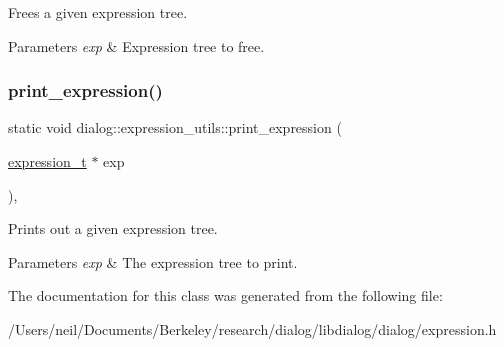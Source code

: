 Frees a given expression tree.


\begin{DoxyParams}{Parameters}
{\em exp} & Expression tree to free. \\
\hline
\end{DoxyParams}
\mbox{\label{classdialog_1_1expression__utils_ab26b15dece4bf0ab5f0879d397b15ad1}} 
\subsubsection{\texorpdfstring{print\+\_\+expression()}{print\_expression()}}
{\footnotesize\ttfamily static void dialog\+::expression\+\_\+utils\+::print\+\_\+expression (\begin{DoxyParamCaption}\item[{\hyperlink{structdialog_1_1expression__t}{expression\+\_\+t} $\ast$}]{exp }\end{DoxyParamCaption})\hspace{0.3cm}{\ttfamily [inline]}, {\ttfamily [static]}}

Prints out a given expression tree.


\begin{DoxyParams}{Parameters}
{\em exp} & The expression tree to print. \\
\hline
\end{DoxyParams}


The documentation for this class was generated from the following file\+:\begin{DoxyCompactItemize}
\item 
/\+Users/neil/\+Documents/\+Berkeley/research/dialog/libdialog/dialog/expression.\+h\end{DoxyCompactItemize}

